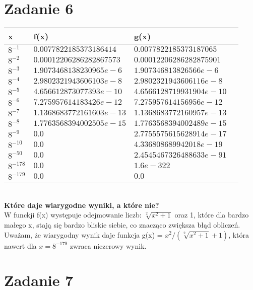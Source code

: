 \documentclass{article}
\begin{document}
\section*{Zadanie 6}

\begin{tabular}{|l|l|l|l|} \hline
x               & f(x)      & g(x)  \\ \hline
${8^{-1}}$      & ${0.0077822185373186414}$      & ${0.0077822185373187065}$   \\ \hline
${8^{-2}}$      & ${0.00012206286282867573}$      & ${0.00012206286282875901}$   \\ \hline
${8^{-3}}$      & ${1.9073468138230965e-6}$      & ${1.907346813826566e-6}$  \\ \hline
${8^{-4}}$      & ${2.9802321943606103e-8}$      & ${2.9802321943606116e-8}$  \\ \hline
${8^{-5}}$      & ${4.656612873077393e-10}$      & ${4.6566128719931904e-10}$  \\ \hline
${8^{-6}}$      & ${7.275957614183426e-12}$      & ${7.275957614156956e-12}$  \\ \hline
${8^{-7}}$      & ${1.1368683772161603e-13}$      & ${1.1368683772160957e-13}$  \\ \hline
${8^{-8}}$      & ${1.7763568394002505e-15}$      & ${1.7763568394002489e-15}$  \\ \hline
${8^{-9}}$      & ${0.0}$      & ${2.7755575615628914e-17}$  \\ \hline
${8^{-10}}$     & ${0.0}$      & ${4.336808689942018e-19}$   \\ \hline
${8^{-50}}$     & ${0.0}$      & ${2.4545467326488633e-91}$   \\ \hline
${8^{-178}}$     & ${0.0}$      & ${1.6e-322}$   \\ \hline
${8^{-179}}$     & ${0.0}$      & ${0.0}$   \\ \hline
\end{tabular} \\

\textbf{Które daje wiarygodne wyniki, a które nie?}\\
W funckji f(x) występuje odejmowanie liczb: ${\sqrt[2]{x^2 + 1}}$ oraz 1, które dla bardzo małego x, stają się bardzo bliskie siebie, co znacząco zwiększa błąd obliczeń.
Uważam, że wiarygodny wynik daje funkcja g(x) = ${{x^2}/{(\sqrt[2]{x^2 + 1} + 1)}}$, która nawert dla  ${x=8^{-179}}$ zwraca niezerowy wynik.
\section*{Zadanie 7}
\end{document}
